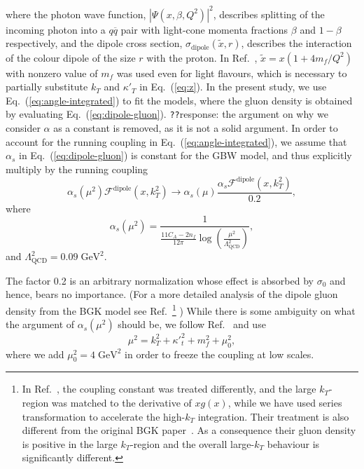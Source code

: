 \documentclass[11pt]{article}
\newcommand{\fdp}[0]{\mathcal{F}^{\mathrm{dipole}}}
\newcommand{\GeV}[0]{\mathrm{GeV}}
\newcommand{\commentPending}[1]{\texttt{\color{red!25}#1}}
\begin{document}
where the photon wave function, $\left|\Psi\left(x,\beta,Q^2\right)\right|^2$,
describes splitting of the incoming photon into a $q\overline{q}$ pair with
light-cone momenta fractions $\beta$ and $1-\beta$ respectively, and the dipole
cross section, $\sigma_{\mathrm{dipole}}\left(\tilde x,r\right)$, describes the
interaction of the colour dipole of the size $r$ with the proton. In
Ref.~\cite{Golec-Biernat:1998zce}, $\tilde{x}=x(1+4m_f/Q^2)$ with nonzero value
of $m_f$ was used even for light flavours, which is necessary to partially
substitute $k_T$ and ${\kappa'}_T$ in Eq.~(\ref{eq:z}).
In the present study, we use Eq.~(\ref{eq:angle-integrated}) to fit the models, where the gluon density is obtained by evaluating Eq.~(\ref{eq:dipole-gluon}).
\commentPending{??}{\color{blue}response: the argument on why we consider $\alpha$ as a constant is removed, as it is not a solid argument.}
In order to account for the running coupling in Eq.~(\ref{eq:angle-integrated}), 
we assume that $\alpha_s$ in Eq.~(\ref{eq:dipole-gluon}) is
constant for the GBW model, and thus explicitly multiply by the running coupling
%
\begin{equation}
\alpha_s(\mu^2)\fdp(x,k_T^2)\rightarrow \alpha_s(\mu)\frac{\alpha_s\fdp(x,k_T^2)}{0.2},
\end{equation}
where
%
\begin{equation}
\alpha_s(\mu^2)=\frac{1}{\frac{11 C_A-2n_f}{12\pi}\log\left(\frac{\mu^2}{\Lambda_{\mathrm{QCD}}^2 }\right)},
\end{equation}
and  $\Lambda_{\mathrm{QCD}}^2=0.09\;\GeV^2$.

The factor 0.2 is an arbitrary normalization whose effect is absorbed by $\sigma_0$ and hence, bears no importance.
(For a more detailed analysis of the dipole gluon density from the BGK model see Ref.~\cite{Luszczak:2022fkf}\footnote{In Ref.~\cite{Luszczak:2022fkf}, the coupling constant was treated differently, and the large $k_T$-region was matched to the derivative of $xg(x)$, while we have used series transformation to accelerate the high-$k_T$ integration. Their treatment is also different from the original BGK paper~\cite{Bartels:2002cj}. As a consequence their gluon density is positive in the large $k_T$-region and the overall large-$k_T$ behaviour is significantly different.}
)
While there is some ambiguity on what the argument of $\alpha_s(\mu^2)$ should be, we follow Ref.~\cite{Kwiecinski:1997ee} and use
\begin{equation}
	\mu^2=k_T^2+{\kappa'}_t^2+m_f^2+\mu^2_0,
\end{equation}
where we add $\mu^2_0=4\;\GeV^2$ in order to freeze the coupling at low scales.
\end{document}
